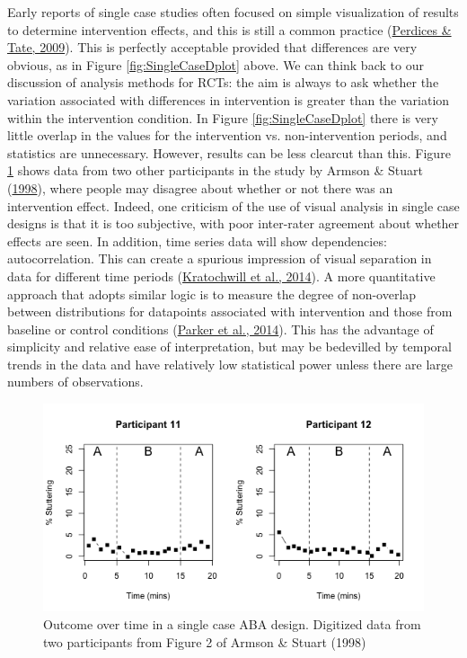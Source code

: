 \documentclass{krantz}
\begin{document}
Early reports of single case studies often focused on simple visualization of results to determine intervention effects, and this is still a common practice (\protect\hyperlink{ref-perdices2009}{Perdices \& Tate, 2009}). This is perfectly acceptable provided that differences are very obvious, as in Figure \ref{fig:SingleCaseDplot} above. We can think back to our discussion of analysis methods for RCTs: the aim is always to ask whether the variation associated with differences in intervention is greater than the variation within the intervention condition. In Figure \ref{fig:SingleCaseDplot} there is very little overlap in the values for the intervention vs. non-intervention periods, and statistics are unnecessary. However, results can be less clearcut than this. Figure \ref{fig:SingleCaseDplot2} shows data from two other participants in the study by Armson \& Stuart (\protect\hyperlink{ref-armson1998}{1998}), where people may disagree about whether or not there was an intervention effect. Indeed, one criticism of the use of visual analysis in single case designs is that it is too subjective, with poor inter-rater agreement about whether effects are seen. In addition, time series data will show dependencies: autocorrelation. This can create a spurious impression of visual separation in data for different time periods (\protect\hyperlink{ref-kratochwill2014b}{Kratochwill et al., 2014}). A more quantitative approach that adopts similar logic is to measure the degree of non-overlap between distributions for datapoints associated with intervention and those from baseline or control conditions (\protect\hyperlink{ref-parker2014}{Parker et al., 2014}). This has the advantage of simplicity and relative ease of interpretation, but may be bedevilled by temporal trends in the data and have relatively low statistical power unless there are large numbers of observations.

\begin{figure}
\includegraphics[width=0.85\linewidth]{images_bw/SingleCaseDplot2} \caption{Outcome over time in a single case ABA design. Digitized data from two participants from Figure 2 of Armson \& Stuart (1998)}\label{fig:SingleCaseDplot2}
\end{figure}
\end{document}

